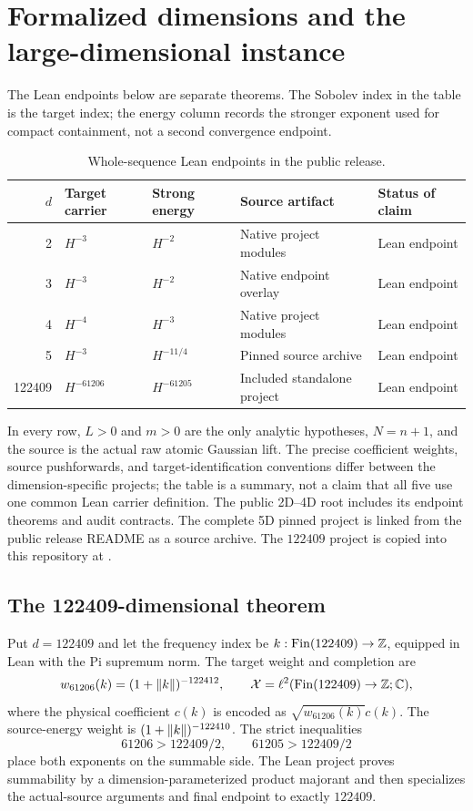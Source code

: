 \section{Formalized dimensions and the large-dimensional instance}\label{sec:formal}
The Lean endpoints below are separate theorems. The Sobolev index in the table is the target index; the energy column records the stronger exponent used for compact containment, not a second convergence endpoint.

\begin{table}[ht]
\centering\small
\caption{Whole-sequence Lean endpoints in the public release.}\label{tab:endpoints}
\begin{tabular}{@{}rllll@{}}
\toprule
$d$ & Target carrier & Strong energy & Source artifact & Status of claim\\
\midrule
2 & $H^{-3}$ & $H^{-2}$ & Native project modules & Lean endpoint\\
3 & $H^{-3}$ & $H^{-2}$ & Native endpoint overlay & Lean endpoint\\
4 & $H^{-4}$ & $H^{-3}$ & Native project modules & Lean endpoint\\
5 & $H^{-3}$ & $H^{-11/4}$ & Pinned source archive & Lean endpoint\\
122409 & $H^{-61206}$ & $H^{-61205}$ & Included standalone project & Lean endpoint\\
\bottomrule
\end{tabular}
\end{table}

In every row, $L>0$ and $m>0$ are the only analytic hypotheses, $N=n+1$, and the source is the actual raw atomic Gaussian lift. The precise coefficient weights, source pushforwards, and target-identification conventions differ between the dimension-specific projects; the table is a summary, not a claim that all five use one common Lean carrier definition. The public 2D--4D root includes its endpoint theorems and audit contracts. The complete 5D pinned project is linked from the public release README as a source archive. The $122409$ project is copied into this repository at .

\subsection{The 122409-dimensional theorem}
Put $d=122409$ and let the frequency index be $k:\mathrm{Fin}(122409)\to\mathbb Z$, equipped in Lean with the Pi supremum norm. The target weight and completion are
\[
 w_{61206}(k)=(1+\lVert k\rVert)^{-122412},\qquad \mathcal X=\ell^2(\mathrm{Fin}(122409)\to\mathbb Z;\mathbb C),
\]
where the physical coefficient $c(k)$ is encoded as $\sqrt{w_{61206}(k)}c(k)$. The source-energy weight is $(1+\lVert k\rVert)^{-122410}$. The strict inequalities
\[
 61206>122409/2,\qquad 61205>122409/2
\]
place both exponents on the summable side. The Lean project proves summability by a dimension-parameterized product majorant and then specializes the actual-source arguments and final endpoint to exactly $122409$.

